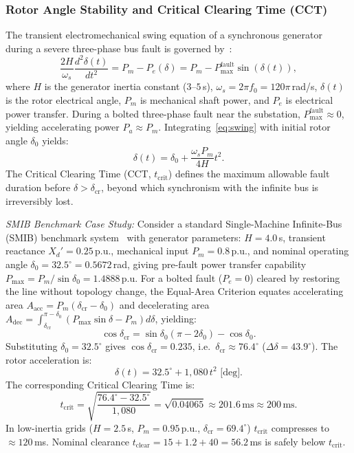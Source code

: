 \documentclass[journal]{IEEEtran}
\begin{document}
\subsubsection{Rotor Angle Stability and Critical Clearing Time (CCT)}
The transient electromechanical swing equation of a synchronous generator during a severe three-phase bus fault is governed by~\cite{kundur1994power}:
\begin{equation}
\frac{2H}{\omega_s} \frac{d^2 \delta(t)}{dt^2} = P_m - P_e(\delta) = P_m - P_{\max}^{\text{fault}} \sin(\delta(t)),
\label{eq:swing}
\end{equation}
where $H$ is the generator inertia constant ($3\text{--}5$\,s), $\omega_s = 2\pi f_0 = 120\pi$\,rad/s, $\delta(t)$ is the rotor electrical angle, $P_m$ is mechanical shaft power, and $P_e$ is electrical power transfer. During a bolted three-phase fault near the substation, $P_{\max}^{\text{fault}} \approx 0$, yielding accelerating power $P_a \approx P_m$. Integrating~\eqref{eq:swing} with initial rotor angle $\delta_0$ yields:
\begin{equation}
\delta(t) = \delta_0 + \frac{\omega_s P_m}{4H} t^2.
\end{equation}
The Critical Clearing Time (CCT, $t_{\text{crit}}$) defines the maximum allowable fault duration before $\delta > \delta_{\text{cr}}$, beyond which synchronism with the infinite bus is irreversibly lost.

\textit{SMIB Benchmark Case Study:} Consider a standard Single-Machine Infinite-Bus (SMIB) benchmark system~\cite{kundur1994power} with generator parameters: $H = 4.0$\,s, transient reactance $X_d' = 0.25$\,p.u., mechanical input $P_m = 0.8$\,p.u., and nominal operating angle $\delta_0 = 32.5^\circ = 0.5672$\,rad, giving pre-fault power transfer capability $P_{\max} = P_m / \sin \delta_0 = 1.4888$\,p.u. For a bolted fault ($P_e = 0$) cleared by restoring the line without topology change, the Equal-Area Criterion equates accelerating area $A_{\text{acc}} = P_m(\delta_{\text{cr}} - \delta_0)$ and decelerating area $A_{\text{dec}} = \int_{\delta_{\text{cr}}}^{\pi - \delta_0} (P_{\max}\sin\delta - P_m)d\delta$, yielding:
\begin{equation}
\cos \delta_{\text{cr}} = \sin \delta_0 (\pi - 2\delta_0) - \cos \delta_0.
\label{eq:eac}
\end{equation}
Substituting $\delta_0=32.5^\circ$ gives $\cos\delta_{\text{cr}}=0.235$, i.e.\ $\delta_{\text{cr}}\approx 76.4^\circ$ ($\Delta\delta=43.9^\circ$). The rotor acceleration is:
\begin{equation}
\delta(t) = 32.5^\circ + 1{,}080\,t^2 \text{ [deg]}.
\end{equation}
The corresponding Critical Clearing Time is:
\begin{equation}
t_{\text{crit}} = \sqrt{\frac{76.4^\circ - 32.5^\circ}{1{,}080}} = \sqrt{0.04065} \approx 201.6\,\text{ms} \approx 200\,\text{ms}.
\end{equation}
In low-inertia grids ($H=2.5$\,s, $P_m=0.95$\,p.u., $\delta_{\text{cr}}=69.4^\circ$) $t_{\text{crit}}$ compresses to $\approx 120$\,ms. Nominal clearance $t_{\text{clear}}=15+1.2+40=56.2$\,ms is safely below $t_{\text{crit}}$.
\end{document}
